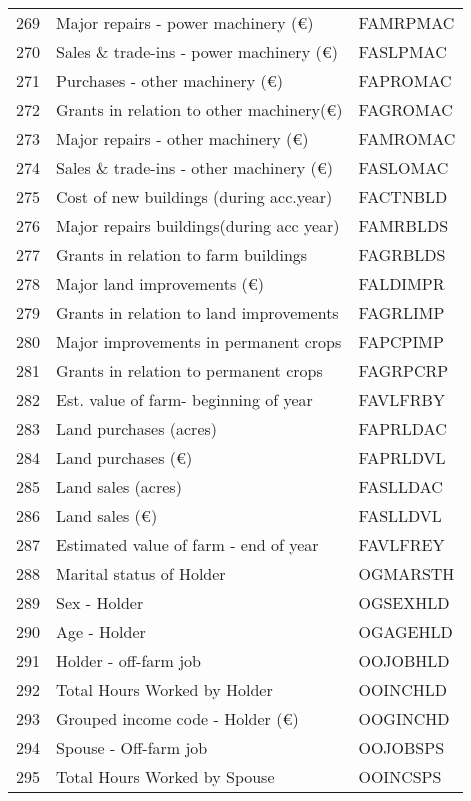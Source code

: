 \documentclass{article}\usepackage{graphicx, color}
\begin{document}
\begin{flushleft}
\begin{table}[ht]
\begin{center}
\begin{tabular}{rll}
  269 & Major repairs - power machinery    (€) & FAMRPMAC \\ 
  270 & Sales \& trade-ins - power machinery (€) & FASLPMAC \\ 
  271 & Purchases - other machinery        (€) & FAPROMAC \\ 
  272 & Grants in relation to other machinery(€) & FAGROMAC \\ 
  273 & Major repairs - other machinery    (€) & FAMROMAC \\ 
  274 & Sales \& trade-ins - other machinery (€) & FASLOMAC \\ 
  275 & Cost of new buildings  (during acc.year) & FACTNBLD \\ 
  276 & Major repairs buildings(during acc year) & FAMRBLDS \\ 
  277 & Grants in relation to farm buildings & FAGRBLDS \\ 
  278 & Major land improvements           (€) & FALDIMPR \\ 
  279 & Grants in relation to land improvements & FAGRLIMP \\ 
  280 & Major improvements in permanent crops & FAPCPIMP \\ 
  281 & Grants in relation to permanent crops & FAGRPCRP \\ 
  282 & Est. value of farm- beginning of year & FAVLFRBY \\ 
  283 & Land purchases              (acres) & FAPRLDAC \\ 
  284 & Land purchases              (€) & FAPRLDVL \\ 
  285 & Land sales                  (acres) & FASLLDAC \\ 
  286 & Land sales                  (€) & FASLLDVL \\ 
  287 & Estimated value of farm - end of year & FAVLFREY \\ 
  288 & Marital status of Holder & OGMARSTH \\ 
  289 & Sex - Holder & OGSEXHLD \\ 
  290 & Age - Holder & OGAGEHLD \\ 
  291 & Holder - off-farm job & OOJOBHLD \\ 
  292 & Total Hours Worked by Holder & OOINCHLD \\ 
  293 & Grouped income code - Holder       (€) & OOGINCHD \\ 
  294 & Spouse - Off-farm job & OOJOBSPS \\ 
  295 & Total Hours Worked by Spouse & OOINCSPS \\ 

\end{tabular}
\end{center}
\end{table}
\end{flushleft}
\end{document}
